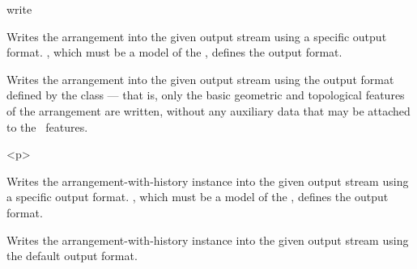 
\ccRefPageBegin
\begin{ccRefFunction}{write}


   {Writes the arrangement  into the given output stream using a specific
    output format. , which must be a model of the
    , defines the output format.}

   {Writes the arrangement  into the given output stream using the
    output format defined by the  class --- that is,
    only the basic geometric and topological features of the arrangement are
    written, without any auxiliary data that may be attached to the \dcel\ features.}

\begin{ccHtmlOnly}<p>\end{ccHtmlOnly}

   {Writes the arrangement-with-history instance  into the given
    output stream using a specific output format. , which must
    be a model of the , defines the output
    format.}

   {Writes the arrangement-with-history instance  into the given
    output stream using the default output format.}

\ccSeeAlso

\end{ccRefFunction}
\ccRefPageEnd
